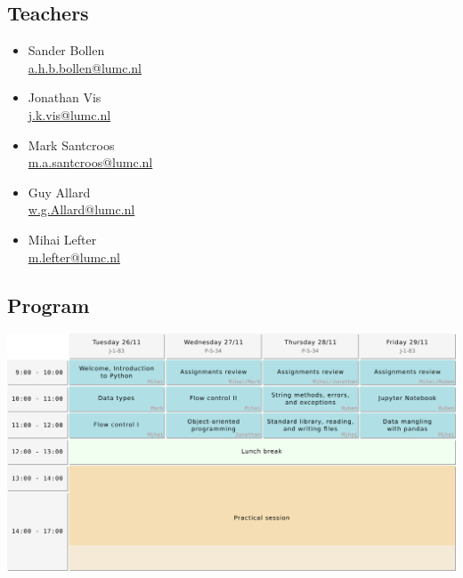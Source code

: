 \documentclass[aspectratio=1610,slidestop]{beamer}
\newcommand{\hrefcc}[2]{\textcolor{#1}{\href{#2}{#2}}}
\begin{document}
\subsection{Teachers}
\begin{pframe}
 \begin{minipage}[t]{0.5\textwidth}
  \begin{itemize}
   \item Sander Bollen \\
     \hrefcc{emailc}{a.h.b.bollen@lumc.nl}
   \item Jonathan Vis \\
     \hrefcc{emailc}{j.k.vis@lumc.nl}
   \item Mark Santcroos \\
     \hrefcc{emailc}{m.a.santcroos@lumc.nl}
   \item Guy Allard \\
     \hrefcc{emailc}{w.g.Allard@lumc.nl}
   \item Mihai Lefter\\
    \hrefcc{emailc}{m.lefter@lumc.nl}
  \end{itemize}
 \end{minipage}
\end{pframe}

\subsection{Program}
\begin{pframe}
 \begin{center}
  \includegraphics[width=\textwidth]{../../images/program.pdf}
 \end{center}
\end{pframe}
\end{document}
